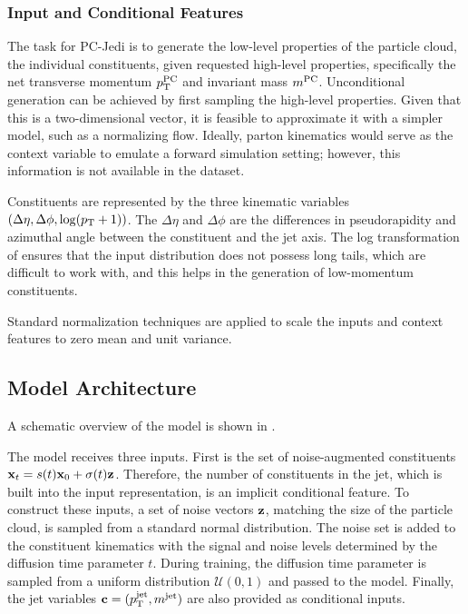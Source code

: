 \subsubsection{Input and Conditional Features}

The task for PC-Jedi is to generate the low-level properties of the particle cloud, the individual constituents, given requested high-level properties, specifically the net transverse momentum $p_\mathrm{T}^{\text{PC}}$ and invariant mass $m^{\text{PC}}$.
Unconditional generation can be achieved by first sampling the high-level properties.
Given that this is a two-dimensional vector, it is feasible to approximate it with a simpler model, such as a normalizing flow.
Ideally, parton kinematics would serve as the context variable to emulate a forward simulation setting; however, this information is not available in the dataset.

Constituents are represented by the three kinematic variables $\left(\Delta\eta, \Delta\phi, \log(p_\mathrm{T} + 1)\right)$.
The $\Delta\eta$ and $\Delta\phi$ are the differences in pseudorapidity and azimuthal angle between the constituent and the jet axis.
The log transformation of \pt ensures that the input distribution does not possess long tails, which are difficult to work with, and this helps in the generation of low-momentum constituents.

Standard normalization techniques are applied to scale the inputs and context features to zero mean and unit variance.

\subsection{Model Architecture}

A schematic overview of the \pcjedi model is shown in .

The model receives three inputs.
First is the set of noise-augmented constituents $\mathbf{x}_t = s(t) \mathbf{x}_0 + \sigma(t) \mathbf{z}$.
Therefore, the number of constituents in the jet, which is built into the input representation, is an implicit conditional feature.
To construct these inputs, a set of noise vectors $\mathbf{z}$, matching the size of the particle cloud, is sampled from a standard normal distribution.
The noise set is added to the constituent kinematics with the signal and noise levels determined by the diffusion time parameter $t$.
During training, the diffusion time parameter is sampled from a uniform distribution $\mathcal{U}(0, 1)$ and passed to the model.
Finally, the jet variables $\mathbf{c} = (p_\mathrm{T}^{\text{jet}}, m^{\text{jet}})$ are also provided as conditional inputs.

